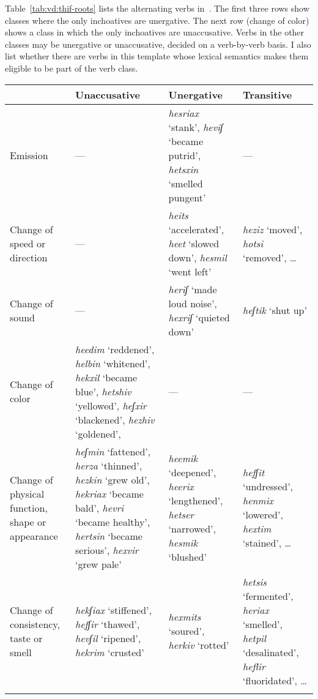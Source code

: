 \begin{exe}
\begin{xlist}
\begin{xlist}
\begin{exe}
\begin{exe}
\begin{xlist}
\begin{exe}
\begin{xlist}
\begin{exe}
\begin{xlist}
\begin{xlist}
Table~\ref{tab:vd:thif-roots} lists the alternating verbs in~{\thif}. The first three rows show classes where the only inchoatives are unergative. The next row (change of color) shows a class in which the only inchoatives are unaccusative. Verbs in the other classes may be unergative or unaccusative, decided on a verb-by-verb basis. I also list whether there are  verbs in this template whose lexical semantics makes them eligible to be part of the verb class.

\begin{table} \small
	\begin{tabularx}{\textwidth}{L{2cm}L{3.5cm}L{3cm}L{2.5cm}}
 \lsptoprule
		&	\textbf{Unaccusative}	&  \textbf{Unergative} & \textbf{Transitive} \\\midrule
	Emission & --- & \emph{hesriax} `stank', \emph{heviʃ} `became putrid', \emph{hetsxin} `smelled pungent'\footnotemark & --- \\
	
	Change of speed or direction & --- & \emph{heits} `accelerated', \emph{heet} `slowed down', \emph{hesmil} `went left' & \emph{heziz} `moved', \emph{hotsi} `removed', \dots \\
	
	Change of sound & --- & \emph{heriʃ} `made loud noise', \emph{hexriʃ} `quieted down' & \emph{heʃtik} `shut up' \\\tablevspace
	
	Change of color & \emph{heedim} `reddened', \emph{helbin} `whitened', \emph{hekxil} `became blue', \emph{he{ts}hiv} `yellowed', \emph{heʃxir} `blackened', \emph{hezhiv} `goldened', 
				& --- & --- \\\tablevspace
		
	Change of physical function, shape or appearance & \emph{heʃmin} `fattened', \emph{herza} `thinned', \emph{hezkin} `grew old', \emph{hekriax} `became bald', \emph{hevri} `became healthy', \emph{her{ts}in} `became serious', \emph{hexvir} `grew pale' &
		\emph{heemik} `deepened', \emph{heerix} `lengthened', \emph{he{ts}er} `narrowed', \emph{hesmik} `blushed' & \emph{hefʃit} `undressed', \emph{henmix} `lowered', \emph{hextim} `stained', \dots \\

	Change of consistency, taste or smell & \emph{hekʃiax} `stiffened', \emph{hefʃir} `thawed', \emph{hevʃil} `ripened', \emph{hekrim} `crusted'
		& \emph{hexmits} `soured', \emph{herkiv} `rotted'
		& \emph{hetsis} `fermented', \emph{heriax} `smelled', \emph{hetpil} `desalinated', \emph{heflir} `fluoridated', \dots \\\tablevspace
		

\end{tabularx}
\end{table}
\end{xlist}
\end{xlist}
\end{exe}
\end{xlist}
\end{exe}
\end{xlist}
\end{exe}
\end{exe}
\end{xlist}
\end{xlist}
\end{exe}
